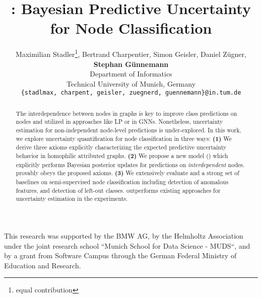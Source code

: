 \documentclass{article}
\title{\ours{}: Bayesian Predictive Uncertainty for Node Classification}
\author{
  Maximilian Stadler\thanks{equal contribution}, Bertrand Charpentier\footnotemark[1], Simon Geisler, Daniel Zügner,\\\textbf{Stephan Günnemann}\\
  Department of Informatics\\
  Technical University of Munich, Germany\\
  \texttt{\{stadlmax, charpent, geisler, zuegnerd, guennemann\}@in.tum.de}\\
}
\begin{document}
\maketitle


\begin{acronym}
\end{acronym}

\begin{abstract}
The interdependence between nodes in graphs is key to improve class predictions on nodes and utilized in approaches like \ac{LP} or in \acp{GNN}. Nonetheless, uncertainty estimation for non-independent node-level predictions is under-explored. In this work, we explore uncertainty quantification for node classification in three ways: \textbf{(1)} We derive three axioms explicitly characterizing the expected predictive uncertainty behavior in homophilic attributed graphs. \textbf{(2)} We propose a new model \ours{} (\oursacro{}) which explicitly performs Bayesian posterior updates for predictions on \emph{interdependent} nodes. \oursacro{} provably obeys the proposed axioms. \textbf{(3)} We extensively evaluate \oursacro{} and a strong set of baselines on semi-supervised node classification including detection of anomalous features, and detection of left-out classes. \oursacro{} outperforms existing approaches for uncertainty estimation in the experiments.
\end{abstract}

\frenchspacing







\begin{ack}
This research was supported by the BMW AG, by the Helmholtz Association under the joint research school “Munich School for Data Science - MUDS“, and by a grant from Software Campus through the German Federal Ministry of Education and Research. 
\end{ack}

\newpage




\newpage
\appendix


\newpage

\end{document}
